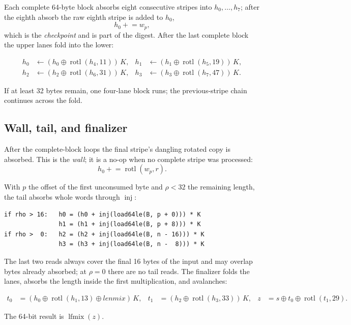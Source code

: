 \documentclass[10pt,a4paper]{article}
\theoremstyle{remark}
\newcommand{\rotl}{\operatorname{rotl}}
\newcommand{\inj}{\operatorname{inj}}
\newcommand{\lfmix}{\operatorname{lfmix}}
\begin{document}
Each complete 64-byte block absorbs eight consecutive stripes into
\(h_0,\ldots,h_7\); after the eighth absorb the raw eighth stripe is added to
\(h_0\),
\[
    h_0 \mathrel{+}= w_p ,
\]
which is the \emph{checkpoint} and is part of the digest.  After the last
complete block the upper lanes fold into the lower:

\begin{align*}
h_0 &\leftarrow (h_0 \oplus \rotl(h_4,11))\,K, &
h_1 &\leftarrow (h_1 \oplus \rotl(h_5,19))\,K,\\
h_2 &\leftarrow (h_2 \oplus \rotl(h_6,31))\,K, &
h_3 &\leftarrow (h_3 \oplus \rotl(h_7,47))\,K.
\end{align*}

If at least 32 bytes remain, one four-lane block runs; the previous-stripe
chain continues across the fold.

\subsection{Wall, tail, and finalizer}
\label{sec:spec-tail}

After the complete-block loops the final stripe's dangling rotated copy is
absorbed.  This is the \emph{wall}; it is a no-op when no complete stripe was
processed:
\[
    h_0 \mathrel{+}= \rotl(w_p,r).
\]

With \(p\) the offset of the first unconsumed byte and \(\rho < 32\) the
remaining length, the tail absorbs whole words through \(\inj\):

\begin{lstlisting}
if rho > 16:   h0 = (h0 + inj(load64le(B, p + 0))) * K
               h1 = (h1 + inj(load64le(B, p + 8))) * K
if rho >  0:   h2 = (h2 + inj(load64le(B, n - 16))) * K
               h3 = (h3 + inj(load64le(B, n -  8))) * K
\end{lstlisting}

The last two reads always cover the final 16 bytes of the input and may
overlap bytes already absorbed; at \(\rho = 0\) there are no tail reads.  The
finalizer folds the lanes, absorbs the length inside the first
multiplication, and avalanches:

\begin{align*}
t_0 &= (h_0 \oplus \rotl(h_1,13) \oplus \mathit{lenmix})\,K, &
t_1 &= (h_2 \oplus \rotl(h_3,33))\,K, &
z   &= s \oplus t_0 \oplus \rotl(t_1,29).
\end{align*}

The 64-bit result is \(\lfmix(z)\).
\end{document}
